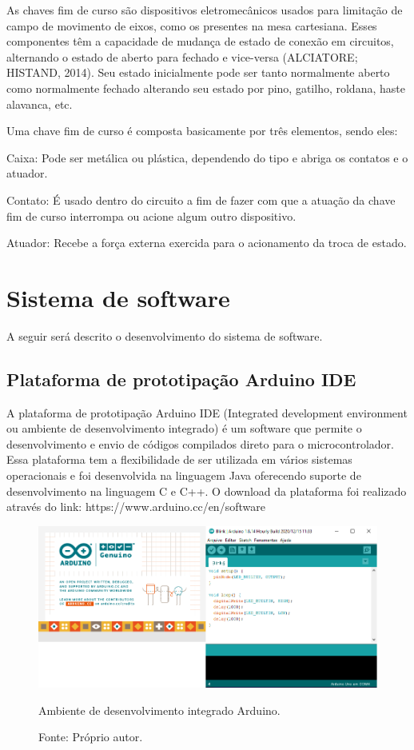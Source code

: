 As chaves fim de curso são dispositivos eletromecânicos usados para limitação de campo de movimento de eixos, 
como os presentes na mesa cartesiana. Esses componentes têm a capacidade de mudança de estado de conexão 
em circuitos, alternando o estado de aberto para fechado e vice-versa (ALCIATORE; HISTAND, 2014). 
Seu estado inicialmente pode ser tanto normalmente aberto como normalmente fechado alterando seu estado 
por pino, gatilho, roldana, haste alavanca, etc. 

Uma chave fim de curso é composta basicamente por três elementos, sendo eles:

\begin{alineas}
    \item Caixa: Pode ser metálica ou plástica, dependendo do tipo e abriga os contatos e o atuador.
    \item Contato: É usado dentro do circuito a fim de fazer com que a atuação da chave fim de curso interrompa ou 
    acione algum outro dispositivo.
    \item Atuador: Recebe a força externa exercida para o acionamento da troca de estado.
\end{alineas}

\section{Sistema de software}

A seguir será descrito o desenvolvimento do sistema de software.

\subsection{Plataforma de prototipação Arduino IDE}

A plataforma de prototipação Arduino IDE (Integrated development environment ou ambiente de desenvolvimento 
integrado) é um software que permite o desenvolvimento e envio de códigos compilados direto para o 
microcontrolador. Essa plataforma tem a flexibilidade de ser utilizada em vários sistemas operacionais 
e foi desenvolvida na linguagem Java oferecendo suporte de desenvolvimento na linguagem C e C++. 
O download da plataforma foi realizado através do link: https://www.arduino.cc/en/software

\begin{figure}[!htb]
\centering
\includegraphics[scale = 0.5]{figuras/3-19}
\caption{Ambiente de desenvolvimento integrado Arduino.}
\caption*{Fonte: Próprio autor.}
\label{figidearduino}
\end{figure}
    

